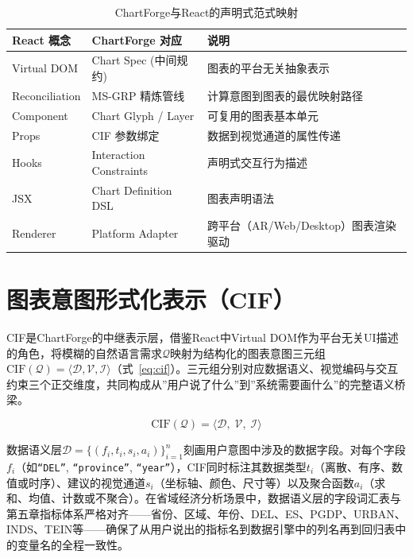 \begin{table}[H]
\centering
\caption{ChartForge与React的声明式范式映射}
\label{tab:react_map}
\begin{tabular}{l|l|l}
\toprule
\textbf{React 概念} & \textbf{ChartForge 对应} & \textbf{说明} \\
\midrule
Virtual DOM     & Chart Spec (中间规约)    & 图表的平台无关抽象表示 \\
Reconciliation  & MS-GRP 精炼管线         & 计算意图到图表的最优映射路径 \\
Component       & Chart Glyph / Layer     & 可复用的图表基本单元 \\
Props           & CIF 参数绑定             & 数据到视觉通道的属性传递 \\
Hooks           & Interaction Constraints & 声明式交互行为描述 \\
JSX             & Chart Definition DSL    & 图表声明语法 \\
Renderer        & Platform Adapter        & 跨平台（AR/Web/Desktop）图表渲染驱动 \\
\bottomrule
\end{tabular}
\end{table}

\section{图表意图形式化表示（CIF）}
\label{sec:cif}

CIF是ChartForge的中继表示层，借鉴React中Virtual DOM作为平台无关UI描述的角色，将模糊的自然语言需求$\mathcal{Q}$映射为结构化的图表意图三元组$\text{CIF}(\mathcal{Q}) = \langle \mathcal{D}, \mathcal{V}, \mathcal{I} \rangle$（式~\ref{eq:cif}）。三元组分别对应数据语义、视觉编码与交互约束三个正交维度，共同构成从”用户说了什么”到”系统需要画什么”的完整语义桥梁。

\begin{equation}\label{eq:cif}
    \text{CIF}(\mathcal{Q}) = \langle \mathcal{D},\; \mathcal{V},\; \mathcal{I} \rangle
\end{equation}

数据语义层$\mathcal{D} = \big\{ (f_i, t_i, s_i, a_i) \big\}_{i=1}^{n}$刻画用户意图中涉及的数据字段。对每个字段$f_i$（如\texttt{“DEL”}, \texttt{“province”}, \texttt{“year”}），CIF同时标注其数据类型$t_i$（离散、有序、数值或时序）、建议的视觉通道$s_i$（坐标轴、颜色、尺寸等）以及聚合函数$a_i$（求和、均值、计数或不聚合）。在省域经济分析场景中，数据语义层的字段词汇表与第五章指标体系严格对齐——省份、区域、年份、DEL、ES、PGDP、URBAN、INDS、TEIN等——确保了从用户说出的指标名到数据引擎中的列名再到回归表中的变量名的全程一致性。

